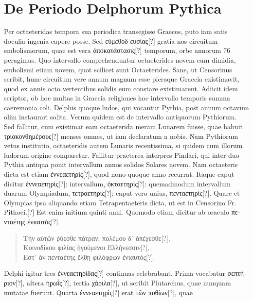 \section{De Periodo Delphorum Pythica}
Per octaeteridas tempora sua periodica transegisse Graecos, puto
iam satis doculia ingenia capere posse.
Sed \textgreek{εὐμεθοδ ευσίας[?]} gratia
nos circuitum embolismorum, quae est vera
 \textgreek{ἀποκατάστασις[?]} temporum,
orbe annorum 76 peragimus.
Quo intervallo comprehenduntur
octaeterides novem cum dimidia, embolismi etiam novem, quot scilicet
sunt Octaeterides.
Sane, ut Censorinus scribit, hunc circuitum
vere annum magnum esse pleraque Graecia existimavit, quod ex annis
octo vertentibus solidis eum constare existimarent.
Adiicit idem
scriptor, ob hoc multas in Graecia religiones hoc intervallo temporis
summa caeremonia coli.
Delphis quoque ludos, qui vocantur Pythia,
post annum octavum olim instaurari solita.
Verum quidem est de intervallo
antiquorum Pythiorum.
Sed fallitur, cum existimat eam octaeterida
meram Lunarem fuisse, quae habuit \textgreek{τριακονθημέρους[?]} menses omnes,
ut iam declaratum a nobis.
Nam Pythiorum vetus institutio,
octaeteridis autem Lunaris recentissima, si quidem cum illorum ludorum
origine comparetur.
Fallitur praeterea interpres Pindari, qui
inter duo Pythia antiqua ponit intervallum annos solidos Solares
novem.
Nam octaeteris dicta est etiam \textgreek{ἐννεαετηρὶς[?]},
 quod nono quoque
anno recurrat.
Itaque caput dicitur \textgreek{ἐννεαετηρὶς[?]}: intervallum,
\textgreek{ὀκταετηρὶς[?]}: quemadmodum intervallum duarum Olympiadum,
 \textgreek{τετραετηρὶς[?]}:
caput vero unius, \textgreek{πενταετηρὶς[?]}.
Quare et Olympias ipsa
aliquando etiam Tetrapentaeteris dicta, ut est in Censorino Fr. Pithoei.[?]
Est enim initium quinti anni.
Quomodo etiam dicitur ab oraculo \textgreek{πενταέτης ἐνιαυτός[?]}.
\begin{verse}
\textgreek{Τὴν αὑτῶν ῥύεσθε πάτραν, πολέμου δ᾽ ἀπέχεσθε[?]},\\
\textgreek{Κοινοδίκου φιλίας ἡγούμενοι Ελλήνεσσιν[?]},\\
\textgreek{Εστ᾽ ἄν πενταέτης ἔλθῃ φιλόφρων ἐνιαυτός[?]}.
\end{verse}
Delphi igitur tres \textgreek{ἐννεαετηρίδας[?]} continuas celebrabant.
Prima vocabatur
\textgreek{σεπτήριον[?]}, altera \textgreek{ἡρωῒς[?]},
 tertia \textgreek{χάριλα[?]}, ut scribit Plutarchus, quae
nunquam mutatae fuerunt.
Quarta \textgreek{ἐννεαετηρὶς[?]} erat \textgreek{τῶν πυθίων[?]}, quae
